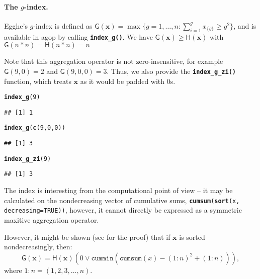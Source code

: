 \documentclass[11pt]{article}\usepackage[]{graphicx}\usepackage[]{color}
\makeatletter
\newcommand{\hlnum}[1]{\textcolor[rgb]{0.686,0.059,0.569}{#1}}%
\newcommand{\hlstd}[1]{\textcolor[rgb]{0.345,0.345,0.345}{#1}}%
\newcommand{\hlkwc}[1]{\textcolor[rgb]{0.333,0.667,0.333}{#1}}%
\newcommand{\hlkwd}[1]{\textcolor[rgb]{0.737,0.353,0.396}{\textbf{#1}}}%
\newenvironment{kframe}{%
 \def\at@end@of@kframe{}%
 \ifinner\ifhmode%
  \def\at@end@of@kframe{\end{minipage}}%
  \begin{minipage}{\columnwidth}%
 \fi\fi%
 \def\FrameCommand##1{\hskip\@totalleftmargin \hskip-\fboxsep
 \colorbox{shadecolor}{##1}\hskip-\fboxsep
     \hskip-\linewidth \hskip-\@totalleftmargin \hskip\columnwidth}%
 \MakeFramed {\advance\hsize-\width
   \@totalleftmargin\z@ \linewidth\hsize
   \@setminipage}}%
 {\par\unskip\endMakeFramed%
 \at@end@of@kframe}
\newenvironment{knitrout}{}{} %
\newcommand{\package}[1]{\textsf{#1}\xspace}
\newcommand{\Rfunc}[1]{\texttt{\hlkwd{#1}}}
\newcommand{\argument}[1]{\texttt{\hlkwc{#1}}}
\newcommand{\vect}[1]{{\mathbf{#1}}}
\newcommand{\func}[1]{{\mathsf{#1}}}
\theoremstyle{remark}
\theoremstyle{definition}
\makeatother
\begin{document}
\paragraph{The $g$-index.}
Egghe's $g$-index \cite{Egghe2006:g}
is defined as
$\func{G}(\vect{x})=\max\{g=1,\dots,n: \sum_{i=1}^g x_{\{g\}}\ge g^2\}$,
and is available in \package{agop} by calling
\index{\Rfunc{index\_g()}}\Rfunc{index\_g()}.
We have $\func{G}(\vect{x})\ge \func{H}(\vect{x})$
with $\func{G}(n\ast n)=\func{H}(n\ast n)=n$


Note that this aggregation operator is not zero-insensitive,
for example $\func{G}(9,0)=2$ and $\func{G}(9,0,0)=3$.
Thus, we also provide the
\index{\Rfunc{index\_g\_zi()}}\Rfunc{index\_g\_zi()} function,
which treats $\vect{x}$ as it would be padded with $0$s.


\begin{knitrout}\small
{}\color{fgcolor}\begin{kframe}
\begin{alltt}
\hlkwd{index_g}\hlstd{(}\hlnum{9}\hlstd{)}
\end{alltt}
\begin{verbatim}
## [1] 1
\end{verbatim}
\begin{alltt}
\hlkwd{index_g}\hlstd{(}\hlkwd{c}\hlstd{(}\hlnum{9}\hlstd{,}\hlnum{0}\hlstd{,}\hlnum{0}\hlstd{))}
\end{alltt}
\begin{verbatim}
## [1] 3
\end{verbatim}
\begin{alltt}
\hlkwd{index_g_zi}\hlstd{(}\hlnum{9}\hlstd{)}
\end{alltt}
\begin{verbatim}
## [1] 3
\end{verbatim}
\end{kframe}
\end{knitrout}

The index is interesting from the computational point of view --
it may be calculated on the nondecreasing vector of cumulative sums,
\texttt{\Rfunc{cumsum}(\Rfunc{sort}(x, \argument{decreasing=}TRUE))},
however, it cannot directly
be expressed as a symmetric maxitive aggregation operator.

However, it might be shown (see \cite{GagolewskiMesiar2014:integrals}
for the proof) that  if $\vect{x}$ is sorted
nondecreasingly, then:
\[
\func{G}(\vect{x}) = \func{H}(\vect{x})(0\vee \mathtt{cummin}(\mathtt{cumsum}(x)-(1:n)^2+(1:n))),
\]
where $1:n = (1, 2, 3, \dots, n)$.
\end{document}
